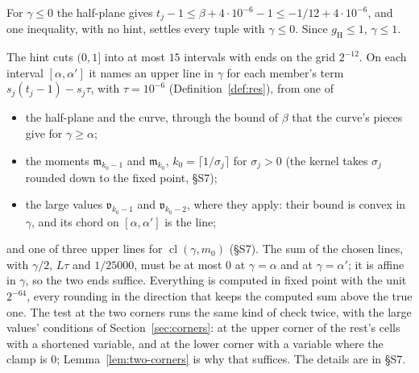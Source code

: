 \documentclass[11pt]{article}
\theoremstyle{definition}
\begin{document}
For $\gamma \le 0$ the half-plane gives $t_j - 1 \le \beta + 4 \cdot 10^{-6} - 1 \le
-1/12 + 4 \cdot 10^{-6}$, and one inequality, with no hint, settles every tuple with $\gamma \le 0$. Since
$g_{\mathrm H} \le 1$, $\gamma \le 1$.

The hint cuts $(0, 1]$ into at most $15$ intervals with ends on the grid $2^{-12}$. On each interval $[\alpha,
\alpha']$ it names an upper line in $\gamma$ for each member's term $s_j(t_j - 1) - s_j\tau$, with $\tau = 10^{-6}$
(Definition~\ref{def:res}), from one of
\begin{itemize}
\item the half-plane and the curve, through the bound of $\beta$ that the curve's pieces give for $\gamma \ge \alpha$;
\item the moments $\mathfrak m_{k_0 - 1}$ and $\mathfrak m_{k_0}$, $k_0 = \lceil 1/\sigma_j \rceil$ for $\sigma_j > 0$
  (the kernel takes $\sigma_j$ rounded down to the fixed point, \S S7);
\item the large values $\mathfrak v_{k_0 - 1}$ and $\mathfrak v_{k_0 - 2}$, where they apply: their bound is convex in
  $\gamma$, and its chord on $[\alpha, \alpha']$ is the line;
\end{itemize}
and one of three upper lines for $\operatorname{cl}(\gamma, m_0)$ (\S S7). The sum of the chosen lines, with
$\gamma/2$, $L\tau$ and $1/25000$, must be at most $0$ at $\gamma = \alpha$ and at $\gamma = \alpha'$; it is affine in
$\gamma$, so the two ends suffice. Everything is computed
in fixed point with the unit $2^{-64}$, every rounding in the direction that keeps the computed sum above the true one.
The test at the two corners runs the same kind of check twice, with the large values' conditions of
Section~\ref{sec:corners}: at the upper corner of the rest's cells with a shortened variable, and at the lower corner
with a variable where the clamp is $0$; Lemma~\ref{lem:two-corners} is why that suffices. The
details are in \S S7.
\end{document}
